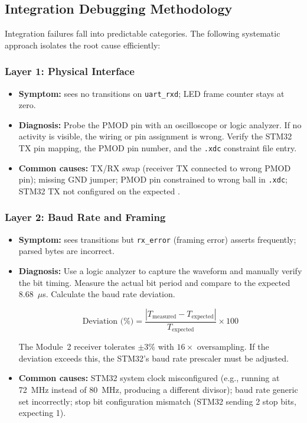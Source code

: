 \documentclass[11pt,letterpaper]{article}
\begin{document}
	\subsection{Integration Debugging Methodology}

	Integration failures fall into predictable categories. The following systematic approach isolates the root cause efficiently:

	\subsubsection{Layer 1: Physical Interface}

	\begin{itemize}[leftmargin=2em]
		\item \textbf{Symptom:} \FPGA{} sees no transitions on \texttt{uart\_rxd}; LED frame counter stays at zero.
		\item \textbf{Diagnosis:} Probe the PMOD pin with an oscilloscope or logic analyzer. If no activity is visible, the wiring or pin assignment is wrong. Verify the STM32 TX pin mapping, the PMOD pin number, and the \texttt{.xdc} constraint file entry.
		\item \textbf{Common causes:} TX/RX swap (receiver TX connected to wrong PMOD pin); missing GND jumper; PMOD pin constrained to wrong \FPGA{} ball in \texttt{.xdc}; STM32 \UART{} TX not configured on the expected \GPIO{}.
	\end{itemize}

	\subsubsection{Layer 2: Baud Rate and Framing}

	\begin{itemize}[leftmargin=2em]
		\item \textbf{Symptom:} \FPGA{} sees transitions but \texttt{rx\_error} (framing error) asserts frequently; parsed bytes are incorrect.
		\item \textbf{Diagnosis:} Use a logic analyzer to capture the \UART{} waveform and manually verify the bit timing. Measure the actual bit period and compare to the expected 8.68~$\mu$s. Calculate the baud rate deviation.

		\begin{equation}
			\text{Deviation (\%)} = \frac{|T_{\text{measured}} - T_{\text{expected}}|}{T_{\text{expected}}} \times 100
			\label{eq:baud_deviation}
		\end{equation}

		The Module~2 \UART{} receiver tolerates $\pm 3\%$ with $16\times$ oversampling. If the deviation exceeds this, the STM32's baud rate prescaler must be adjusted.

		\item \textbf{Common causes:} STM32 system clock misconfigured (e.g., running at 72~MHz instead of 80~MHz, producing a different \UART{} divisor); \FPGA{} baud rate generic set incorrectly; stop bit configuration mismatch (STM32 sending 2 stop bits, \FPGA{} expecting 1).
	\end{itemize}
\end{document}
